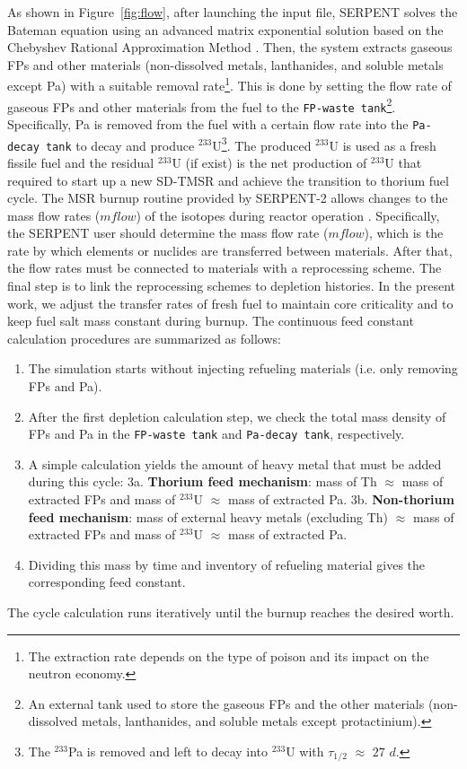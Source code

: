 As shown in Figure~\ref{fig:flow}, after launching the input file, SERPENT solves the Bateman equation using an advanced 
matrix exponential solution based on the Chebyshev Rational Approximation 
Method \cite{isotalo2016improving}. 
Then, the system extracts gaseous \gls{FPs} and other materials 
(non-dissolved metals, lanthanides, and soluble metals except Pa) with 
a suitable removal rate\footnote{The extraction rate depends on the type of 
poison and its impact on the neutron
economy.}. This is done by setting the 
flow rate of gaseous \gls{FPs} and other materials from the fuel to the 
\texttt{FP-waste tank}\footnote{An external tank used to store the gaseous 
\gls{FPs} and the other materials (non-dissolved metals, lanthanides, and 
soluble metals except protactinium).}. Specifically, Pa is removed 
from the fuel with a certain flow rate into the 
\texttt{Pa-decay tank} to decay and produce $^{233}$U\footnote{The 
$^{233}$Pa is removed and left to decay into $^{233}$U with $\tau_{1/2}$ 
$\approx$ $27$ $d$.}. The produced $^{233}$U is used as a fresh fissile fuel 
and the residual $^{233}$U (if exist) is the net production of $^{233}$U that required to start up a new SD-TMSR and achieve the transition to thorium fuel cycle. The MSR burnup 
routine provided by SERPENT-2 allows changes to the mass flow rates ($mflow$) of the 
isotopes during reactor operation \cite{aufiero2013extended}. Specifically, the SERPENT user should determine the mass flow rate ($mflow$), which is the rate by 
which elements or nuclides are transferred between materials. After that, the 
flow rates must be connected to materials with a reprocessing scheme. 
The final step is to link the reprocessing schemes to depletion histories. In 
the present work, we adjust the transfer rates of fresh fuel to maintain core 
criticality and to keep fuel salt mass constant during burnup. The continuous feed constant calculation procedures are summarized as follows:
\begin{enumerate}
	\item The simulation starts without injecting refueling materials (i.e. only removing FPs and Pa).
	\item After the first depletion calculation step, we check the total mass density of FPs and Pa in the \texttt{FP-waste tank} and \texttt{Pa-decay tank}, respectively.
	\item A simple calculation yields the amount of heavy metal that must be added during this cycle:
	\subitem 3a. \textbf{Thorium feed mechanism}: mass of Th $\approx$ mass of extracted FPs and mass of $^{233}$U $\approx$ mass of extracted Pa.
	\subitem 3b. \textbf{Non-thorium feed mechanism}: mass of external heavy metals (excluding Th) $\approx$ mass of extracted FPs and mass of $^{233}$U $\approx$ mass of extracted Pa.
	\item Dividing this mass by time and inventory of refueling material gives the corresponding feed constant.
\end{enumerate}
The cycle calculation runs iteratively until the burnup reaches the desired worth.


